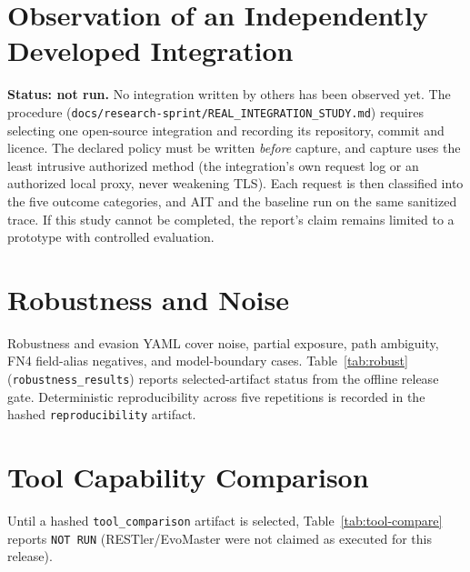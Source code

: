 \documentclass[12pt,a4paper]{report}
\begin{document}
\section{Observation of an Independently Developed Integration}
\label{sec:realint}

\textbf{Status: not run.} No integration written by others has been observed yet. The procedure
(\texttt{docs/research-sprint/REAL\_INTEGRATION\_STUDY.md}) requires selecting one open-source
integration and recording its repository, commit and licence. The declared policy must be written
\emph{before} capture, and capture uses the least intrusive authorized method (the integration's
own request log or an authorized local proxy, never weakening TLS). Each request is then
classified into the five outcome categories, and AIT and the baseline run on the same sanitized
trace. If this study cannot be completed, the report's claim remains limited to a prototype with
controlled evaluation.

\section{Robustness and Noise}

Robustness and evasion YAML cover noise, partial exposure, path ambiguity, FN4
field-alias negatives, and model-boundary cases. Table~\ref{tab:robust}
(\texttt{robustness\_results}) reports selected-artifact status from the offline
release gate. Deterministic reproducibility across five repetitions is recorded
in the hashed \texttt{reproducibility} artifact.

\begin{table}[H]
    \centering
    \caption{Robustness / Evasion Suite Status}
    \label{tab:robust}
    
\end{table}

\section{Tool Capability Comparison}

Until a hashed \texttt{tool\_comparison} artifact is selected, Table~\ref{tab:tool-compare}
reports \texttt{NOT RUN} (RESTler/EvoMaster were not claimed as executed for this release).

\begin{table}[H]
    \centering
    \caption{Tool Capability Comparison (selected artifact or \texttt{NOT RUN})}
    \label{tab:tool-compare}
    
\end{table}
\end{document}
